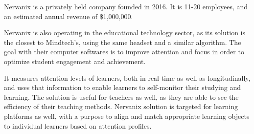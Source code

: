 \documentclass[letterpaper,10pt]{article}
\begin{document}

Nervanix is a privately held company founded in 2016. It is 11-20 employees, and an estimated annual revenue of \$1,000,000. 

\cite{mergent_intellect}

Nervanix is also operating in the educational technology sector, as its solution is the closest to Mindtech's, using the same headset and a similar algorithm. The goal with their computer softwares is to improve attention and focus in order to optimize student engagement and achievement. 

It measures attention levels of learners, both in real time as well as longitudinally, and uses that information to enable learners to self-monitor their studying and learning.
The solution is useful for teachers as well, as they are able to see the efficiency of their teaching methods. Nervanix solution is targeted for learning platforms as well, with a purpose to align and match appropriate learning objects to individual learners based on attention profiles.
 
\end{document}
